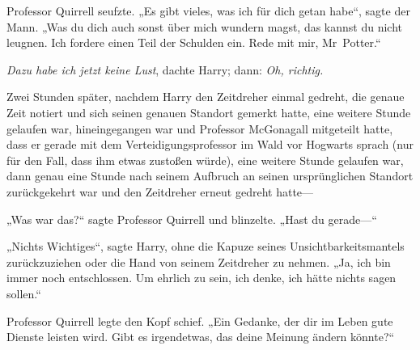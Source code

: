 Professor Quirrell seufzte. „Es gibt vieles, was ich für dich getan habe“, sagte der Mann. „Was du dich auch sonst über mich wundern magst, das kannst du nicht leugnen. Ich fordere einen Teil der Schulden ein. Rede mit mir, Mr~Potter.“

\emph{Dazu habe ich jetzt keine Lust}, dachte Harry; dann: \emph{Oh, richtig.}

\later

Zwei Stunden später, nachdem Harry den Zeitdreher einmal gedreht, die genaue Zeit notiert und sich seinen genauen Standort gemerkt hatte, eine weitere Stunde gelaufen war, hineingegangen war und Professor McGonagall mitgeteilt hatte, dass er gerade mit dem Verteidigungsprofessor im Wald vor Hogwarts sprach (nur für den Fall, dass ihm etwas zustoßen würde), eine weitere Stunde gelaufen war, dann genau eine Stunde nach seinem Aufbruch an seinen ursprünglichen Standort zurückgekehrt war und den Zeitdreher erneut gedreht hatte—

\later

„Was war das?“ sagte Professor Quirrell und blinzelte. „Hast du gerade—“

„Nichts Wichtiges“, sagte Harry, ohne die Kapuze seines Unsichtbarkeitsmantels zurückzuziehen oder die Hand von seinem Zeitdreher zu nehmen. „Ja, ich bin immer noch entschlossen. Um ehrlich zu sein, ich denke, ich hätte nichts sagen sollen.“

Professor Quirrell legte den Kopf schief. „Ein Gedanke, der dir im Leben gute Dienste leisten wird. Gibt es irgendetwas, das deine Meinung ändern könnte?“

